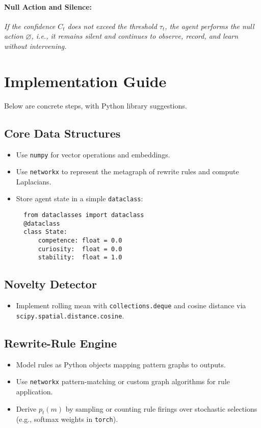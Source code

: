 \documentclass[11pt]{article}
\begin{document}
\paragraph{Null Action and Silence:}
\textit{If the confidence $C_t$ does not exceed the threshold $\tau_t$, the agent performs the null action $\varnothing$, i.e., it remains silent and continues to observe, record, and learn without intervening.}

\section{Implementation Guide}

Below are concrete steps, with Python library suggestions.

\subsection{Core Data Structures}
\begin{itemize}
  \item Use \texttt{numpy} for vector operations and embeddings.
  \item Use \texttt{networkx} to represent the metagraph of rewrite rules and compute Laplacians.
  \item Store agent state in a simple \texttt{dataclass}:
  \begin{verbatim}
  from dataclasses import dataclass
  @dataclass
  class State:
      competence: float = 0.0
      curiosity:  float = 0.0
      stability:  float = 1.0
  \end{verbatim}
\end{itemize}

\subsection{Novelty Detector}
\begin{itemize}
  \item Implement rolling mean with \texttt{collections.deque} and cosine distance via \texttt{scipy.spatial.distance.cosine}.
\end{itemize}

\subsection{Rewrite-Rule Engine}
\begin{itemize}
  \item Model rules as Python objects mapping pattern graphs to outputs.
  \item Use \texttt{networkx} pattern-matching or custom graph algorithms for rule application.
  \item Derive $p_t(m)$ by sampling or counting rule firings over stochastic selections (e.g., softmax weights in \texttt{torch}).
\end{itemize}
\end{document}
